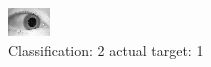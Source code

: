 \begin{figure}[h!]
\begin{center}
\includegraphics[width=0.60\columnwidth]{figures/ID1475_class_2_target_1.png}
\end{center}
\caption{ Classification: 2 actual target: 1}
\label{fig:ID1475_class_2_target_1}
\end{figure}
